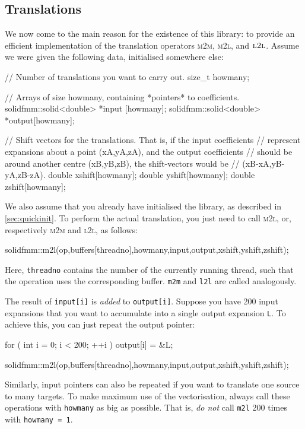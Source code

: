 \documentclass{scrbook}
\begin{document}
\subsection{Translations}\label{sec:quicktranslations}
We now come to the main reason for the existence of this library: to provide an
efficient implementation of the translation operators \textsc{m2m},
\textsc{m2l}, and $\textsc{l2l}$. Assume we were given the following data,
initialised
somewhere else:
\begin{cppcode*}
// Number of translations you want to carry out.
size_t howmany;

// Arrays of size howmany, containing *pointers* to coefficients.
solidfmm::solid<double> *input [howmany];   
solidfmm::solid<double> *output[howmany];  

// Shift vectors for the translations. That is, if the input coefficients
// represent expansions about a point (xA,yA,zA), and the output coefficients
// should be around another centre (xB,yB,zB), the shift-vectors would be
// (xB-xA,yB-yA,zB-zA).
double xshift[howmany]; 
double yshift[howmany];
double zshift[howmany];
\end{cppcode*}

We also assume that you already have initialised the library, as described
in \cref{sec:quickinit}. To perform the actual translation, you just need to
call \textsc{m2l}, or, respectively \textsc{m2m} and \textsc{l2l}, as follows:
\begin{cppcode*}
solidfmm::m2l(op,buffers[threadno],howmany,input,output,xshift,yshift,zshift);
\end{cppcode*}
Here, \lstinline|threadno| contains the number of the currently running
thread, such that the operation uses the corresponding buffer. \lstinline|m2m|
and \lstinline|l2l| are called analogously.

The result of \lstinline|input[i]| is \emph{added} to \lstinline|output[i]|.
Suppose you have 200 input expansions that you want to accumulate into a single
output expansion \lstinline|L|. To achieve this, you can just repeat the
output pointer:
\begin{cppcode*}
for ( int i = 0; i < 200; ++i )
	output[i] = &L;

solidfmm::m2l(op,buffers[threadno],howmany,input,output,xshift,yshift,zshift);
\end{cppcode*}
Similarly, input pointers can also be repeated if you want to translate one
source to many targets. To make maximum use of the vectorisation, always call
these operations with \lstinline|howmany| as big as possible. That is,
\emph{do not} call \lstinline|m2l| 200 times with \lstinline|howmany = 1|.
\end{document}
